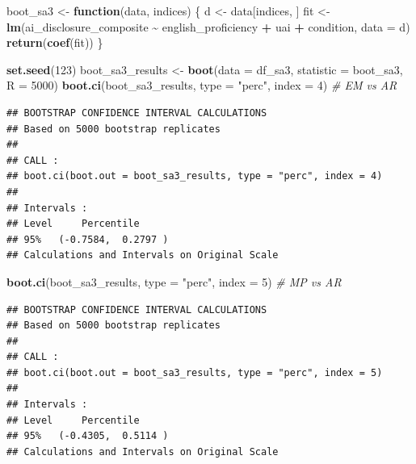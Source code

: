 \documentclass[
]{article}
\newenvironment{Shaded}{\begin{snugshade}}{\end{snugshade}}
\newcommand{\AttributeTok}[1]{\textcolor[rgb]{0.13,0.29,0.53}{#1}}
\newcommand{\CommentTok}[1]{\textcolor[rgb]{0.56,0.35,0.01}{\textit{#1}}}
\newcommand{\ControlFlowTok}[1]{\textcolor[rgb]{0.13,0.29,0.53}{\textbf{#1}}}
\newcommand{\DecValTok}[1]{\textcolor[rgb]{0.00,0.00,0.81}{#1}}
\newcommand{\FunctionTok}[1]{\textcolor[rgb]{0.13,0.29,0.53}{\textbf{#1}}}
\newcommand{\NormalTok}[1]{#1}
\newcommand{\OtherTok}[1]{\textcolor[rgb]{0.56,0.35,0.01}{#1}}
\newcommand{\SpecialCharTok}[1]{\textcolor[rgb]{0.81,0.36,0.00}{\textbf{#1}}}
\newcommand{\StringTok}[1]{\textcolor[rgb]{0.31,0.60,0.02}{#1}}
\begin{document}
\begin{Shaded}
\begin{Highlighting}[]
\NormalTok{boot\_sa3 }\OtherTok{\textless{}{-}} \ControlFlowTok{function}\NormalTok{(data, indices) \{}
\NormalTok{  d }\OtherTok{\textless{}{-}}\NormalTok{ data[indices, ]}
\NormalTok{  fit }\OtherTok{\textless{}{-}} \FunctionTok{lm}\NormalTok{(ai\_disclosure\_composite }\SpecialCharTok{\textasciitilde{}}\NormalTok{ english\_proficiency }\SpecialCharTok{+}\NormalTok{ uai }\SpecialCharTok{+}\NormalTok{ condition, }\AttributeTok{data =}\NormalTok{ d)}
  \FunctionTok{return}\NormalTok{(}\FunctionTok{coef}\NormalTok{(fit))}
\NormalTok{\}}

\FunctionTok{set.seed}\NormalTok{(}\DecValTok{123}\NormalTok{)}
\NormalTok{boot\_sa3\_results }\OtherTok{\textless{}{-}} \FunctionTok{boot}\NormalTok{(}\AttributeTok{data =}\NormalTok{ df\_sa3, }\AttributeTok{statistic =}\NormalTok{ boot\_sa3, }\AttributeTok{R =} \DecValTok{5000}\NormalTok{)}
\FunctionTok{boot.ci}\NormalTok{(boot\_sa3\_results, }\AttributeTok{type =} \StringTok{"perc"}\NormalTok{, }\AttributeTok{index =} \DecValTok{4}\NormalTok{) }\CommentTok{\# EM vs AR}
\end{Highlighting}
\end{Shaded}

\begin{verbatim}
## BOOTSTRAP CONFIDENCE INTERVAL CALCULATIONS
## Based on 5000 bootstrap replicates
## 
## CALL : 
## boot.ci(boot.out = boot_sa3_results, type = "perc", index = 4)
## 
## Intervals : 
## Level     Percentile     
## 95%   (-0.7584,  0.2797 )  
## Calculations and Intervals on Original Scale
\end{verbatim}

\begin{Shaded}
\begin{Highlighting}[]
\FunctionTok{boot.ci}\NormalTok{(boot\_sa3\_results, }\AttributeTok{type =} \StringTok{"perc"}\NormalTok{, }\AttributeTok{index =} \DecValTok{5}\NormalTok{) }\CommentTok{\# MP vs AR}
\end{Highlighting}
\end{Shaded}

\begin{verbatim}
## BOOTSTRAP CONFIDENCE INTERVAL CALCULATIONS
## Based on 5000 bootstrap replicates
## 
## CALL : 
## boot.ci(boot.out = boot_sa3_results, type = "perc", index = 5)
## 
## Intervals : 
## Level     Percentile     
## 95%   (-0.4305,  0.5114 )  
## Calculations and Intervals on Original Scale
\end{verbatim}
\end{document}
